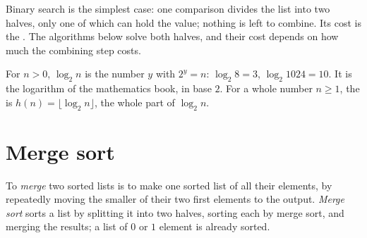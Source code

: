 Binary search is the simplest case: one comparison divides the list into two halves, only one of which can hold the
value; nothing is left to combine. Its cost is the . The algorithms below solve both halves, and
their cost depends on how much the combining step costs.

\begin{notation}\label{not:g12:divide-and-conquer:log2}
For $n > 0$, $\log_2 n$ is the number $y$ with $2^y = n$: $\log_2 8 = 3$,
$\log_2 1024 = 10$. It is the logarithm of the mathematics book, in base $2$. For a whole number $n \ge 1$, the  is $h(n) = \lfloor \log_2 n \rfloor$, the whole part of $\log_2 n$.
\end{notation}

\section{Merge sort}\label{sec:g12:divide-and-conquer:merge-sort}

\begin{definition}\label{def:g12:divide-and-conquer:merge}
To \emph{merge} two sorted lists is to make one sorted list of all their elements, by
repeatedly moving the smaller of their two first elements to the output. \emph{Merge sort} sorts a
list by splitting it into two halves, sorting each by merge sort, and merging the results; a list of $0$ or $1$
element is already sorted.
\end{definition}

\label{lst:g12:divide-and-conquer:merge}

\label{out:g12:divide-and-conquer:merge}

